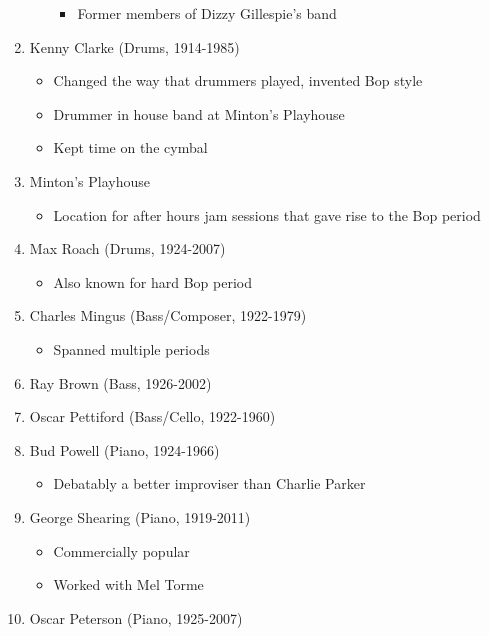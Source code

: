 \documentclass[]{article}
\providecommand{\tightlist}{%
  \setlength{\itemsep}{0pt}\setlength{\parskip}{0pt}}
\begin{document}
\begin{enumerate}
\begin{itemize}
    \begin{itemize}
    \tightlist
    \item
      Former members of Dizzy Gillespie's band
    \end{itemize}
  \end{itemize}
\item
  Kenny Clarke (Drums, 1914-1985)

  \begin{itemize}
  \tightlist
  \item
    Changed the way that drummers played, invented Bop style
  \item
    Drummer in house band at Minton's Playhouse
  \item
    Kept time on the cymbal
  \end{itemize}
\item
  Minton's Playhouse

  \begin{itemize}
  \tightlist
  \item
    Location for after hours jam sessions that gave rise to the Bop
    period
  \end{itemize}
\item
  Max Roach (Drums, 1924-2007)

  \begin{itemize}
  \tightlist
  \item
    Also known for hard Bop period
  \end{itemize}
\item
  Charles Mingus (Bass/Composer, 1922-1979)

  \begin{itemize}
  \tightlist
  \item
    Spanned multiple periods
  \end{itemize}
\item
  Ray Brown (Bass, 1926-2002)
\item
  Oscar Pettiford (Bass/Cello, 1922-1960)
\item
  Bud Powell (Piano, 1924-1966)

  \begin{itemize}
  \tightlist
  \item
    Debatably a better improviser than Charlie Parker
  \end{itemize}
\item
  George Shearing (Piano, 1919-2011)

  \begin{itemize}
  \tightlist
  \item
    Commercially popular
  \item
    Worked with Mel Torme
  \end{itemize}
\item
  Oscar Peterson (Piano, 1925-2007)


\end{enumerate}
\end{document}

